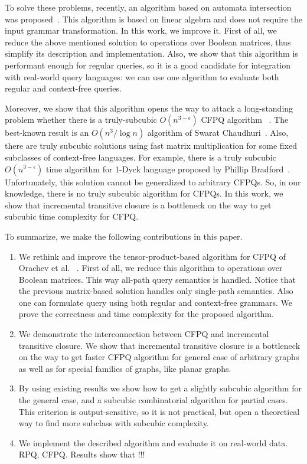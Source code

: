 To solve these problems, recently, an algorithm based on automata intersection was proposed~\cite{10.1007/978-3-030-54832-2_6}.
This algorithm is based on linear algebra and does not require the input grammar transformation.
In this work, we improve it.
First of all, we reduce the above mentioned solution to operations over Boolean matrices, thus simplify its description and implementation.
Also, we show that this algorithm is performant enough for regular queries, so it is a good candidate for integration with real-world query languages: we can use one algorithm to evaluate both regular and context-free queries. 

Moreover, we show that this algorithm opens the way to attack a long-standing problem whether there is a truly-subcubic $O(n^{3-\epsilon})$ CFPQ algorithm ~\cite{10.1145/1328438.1328460, Yannakakis}. 
The best-known result is an $O(n^3/\log{n})$ algorithm of Swarat Chaudhuri~\cite{10.1145/1328438.1328460}. 
Also, there are truly subcubic solutions using fast matrix multiplication for some fixed subclasses of context-free languages. 
For example, there is a truly subcubic  $O(n^{3-\epsilon})$ time algorithm for 1-Dyck language proposed by Phillip Bradford~\cite{8249039}.
Unfortunately, this solution cannot be generalized to arbitrary CFPQs. 
So, in our knowledge, there is no truly subcubic algorithm for CFPQs. 
In this work, we show that incremental transitive closure is a bottleneck on the way to get subcubic time complexity for CFPQ.

To summarize, we make the following contributions in this paper.
\begin{enumerate}
	\item We rethink and improve the tensor-product-based algorithm for CFPQ of Orachev et al. ~\cite{10.1007/978-3-030-54832-2_6}. First of all, we reduce this algorithm to operations over Boolean matrices. This way all-path query semantics is handled. Notice that the previous matrix-based solution handles only single-path semantics. Also one can formulate query using both regular and context-free grammars. We prove the correctness and time complexity for the proposed algorithm.
	\item We demonstrate the interconnection between CFPQ and incremental transitive closure. We show that incremental transitive closure is a bottleneck on the way to get faster CFPQ algorithm for general case of arbitrary graphs as well as for special families of graphs, like planar graphs.
	\item By using existing results we show how to get a slightly subcubic algorithm for the general case, and a subcubic combinatorial algorithm for partial cases. This criterion is output-sensitive, so it is not practical, but open a theoretical way to find more subclass with subcubic complexity.
	\item We implement the described algorithm and evaluate it on real-world data. RPQ, CFPQ. Results show that !!!
\end{enumerate}
